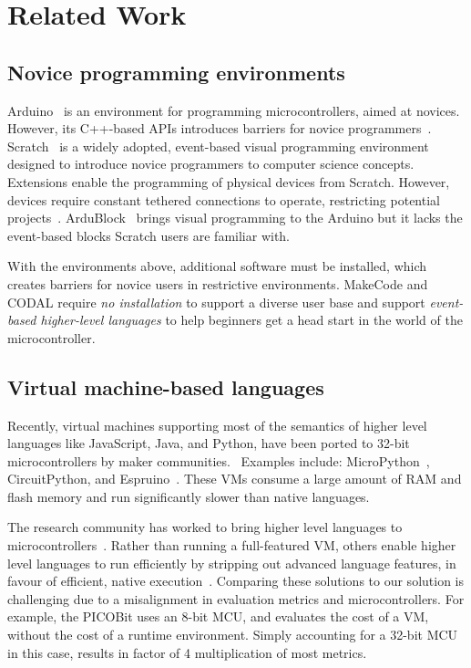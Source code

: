 \section{Related Work}
\label{sec:related}
\subsection{Novice programming environments}

Arduino~\cite{buildingArduino2014} is an environment for programming microcontrollers, aimed at novices. However, its C++-based APIs introduces barriers for novice programmers~\cite{blikstein2013gears}. Scratch~\cite{ScratchCACM2009} is a widely adopted, event-based visual programming environment designed to introduce novice programmers to computer science concepts. Extensions enable the programming of physical devices from Scratch. However, devices require constant tethered connections to operate, restricting potential projects~\cite{dougherty2012maker}. ArduBlock~\cite{Ardubloc28:online} brings visual programming to the Arduino but it lacks the event-based blocks Scratch users are familiar with.

With the environments above, additional software must be installed, which creates barriers for novice users in restrictive environments. MakeCode and CODAL require \emph{no installation} to support a diverse user base and support \emph{event-based higher-level languages} to help beginners get a head start in the world of the microcontroller.

\subsection{Virtual machine-based languages}

Recently, virtual machines supporting most of the semantics of higher level languages like JavaScript, Java, and Python, have been ported to 32-bit microcontrollers by maker communities.~\cite{dougherty2012maker} Examples include: MicroPython~\cite{MicroPython}, CircuitPython, and Espruino~\cite{espruinoBook}. These VMs consume a large amount of RAM and flash memory and run significantly slower than native languages.

The research community has worked to bring higher level languages to microcontrollers~\cite{koshy2005vmstar,st2009picobit,vaugon2015programming}. Rather than running a full-featured VM, others enable higher level languages to run efficiently by stripping out advanced language features, in favour of efficient, native execution~\cite{varma2004java}. Comparing these solutions to our solution is challenging due to a misalignment in evaluation metrics and microcontrollers. For example, the PICOBit uses an 8-bit MCU, and evaluates the cost of a VM, without the cost of a runtime environment. Simply accounting for a 32-bit MCU in this case, results in factor of 4 multiplication of most metrics.

